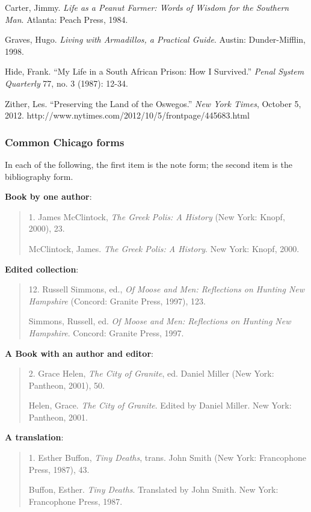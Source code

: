\documentclass[12pt, hidelinks]{article} %
\newcommand{\tab}{\hspace*{2em}}
\begin{document}
Carter, Jimmy. \emph{Life as a Peanut Farmer: Words of Wisdom for the Southern Man}. \tab Atlanta: Peach Press, 1984.

Graves, Hugo. \emph{Living with Armadillos, a Practical Guide}. Austin: Dunder-Mifflin, \tab 1998.

Hide, Frank. ``My Life in a South African Prison: How I Survived.'' \emph{Penal System \tab Quarterly} 
77, no. 3 (1987): 12-34.

Zither, Les. ``Preserving the Land of the Oswegos.'' \emph{New York Times}, October 5, \tab 2012. http://www.nytimes.com/2012/10/5/frontpage/445683.html


\newpage




\subsubsection{Common Chicago forms}

In each of the following, the first item is the note form; the second item is the bibliography form.
	 	 	
\textbf{Book by one author}:

\begin{quote}
\tab 1. James McClintock, \emph{The Greek Polis: A History} (New York: Knopf, 2000), 23.

McClintock, James. \emph{The Greek Polis: A History}. New York: Knopf, \tab 2000.
\end{quote}


\textbf{Edited collection}:
\begin{quote}
\tab 12. Russell Simmons, ed., \emph{Of Moose and Men: Reflections on Hunting New Hampshire} (Concord: Granite Press, 1997), 123.

Simmons, Russell, ed. \emph{Of Moose and Men: Reflections on Hunting New \tab Hampshire}. Concord: Granite Press, 1997.
\end{quote}

\textbf{A Book with an author and editor}:

\begin{quote}
\tab 2. Grace Helen, \emph{The City of Granite}, ed. Daniel Miller (New York: Pantheon, 2001), 50.

Helen, Grace. \emph{The City of Granite}. Edited by Daniel Miller. New York: \tab Pantheon, 2001.
\end{quote}

\textbf{A translation}:
\begin{quote}
\tab 1. Esther Buffon, \emph{Tiny Deaths}, trans. John Smith (New York: Francophone Press, 1987), 43.

Buffon, Esther. \emph{Tiny Deaths}. Translated by John Smith. New York: \tab Francophone Press, 1987.
\end{quote}
\end{document}

